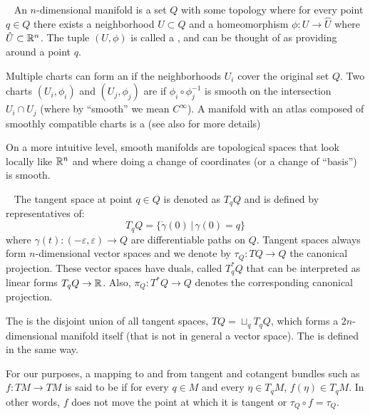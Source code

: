 \label{notion:manifold}~\cite[\S1]{leeSmoothManifolds2013} An $n$-dimensional manifold is a set $Q$ with some topology where for every point $q \in Q$ there exists a neighborhood $U \subset Q$ and a homeomorphism $\phi : U \to \hat{U}$ where $\hat{U} \subset {\mathbb{R}}^n$. The tuple $(U, \phi)$ is called a , and can be thought of as providing  around a point $q$.

Multiple charts can form an  if the neighborhoods $U_i$ cover the original set $Q$. Two charts $(U_i, \phi_i)$ and $(U_j, \phi_j)$ are  if $\phi_i \circ \phi_j^{-1}$ is smooth on the intersection $U_i \cap U_j$ (where by ``smooth'' we mean $C^\infty$). A manifold with an atlas composed of smoothly compatible charts is a  (see also \cite{marsdenIntroductionMechanicsSymmetry1999} for more details)%

On a more intuitive level, smooth manifolds are topological spaces that look locally like ${\mathbb{R}}^n$ and where doing a change of coordinates (or a change of ``basis'') is smooth.


~\cite[\S3]{leeSmoothManifolds2013} The tangent space at point $q \in Q$ is denoted as $T_q Q$ and is defined by representatives of:
\[ T_q Q = \{ \dot{\gamma}(0) \, | \, \gamma(0) = q \} \]
where $\gamma(t) : (-\varepsilon, \varepsilon) \to Q$ are differentiable paths on $Q$. Tangent spaces always form $n$-dimensional vector spaces and we denote by $\tau_Q: TQ \to Q$ the canonical projection. These vector spaces have duals, called  $T_q^* Q$ that can be interpreted as linear forms $T_q Q \to {\mathbb{R}}$. Also, $\pi_Q: T^*Q \to Q$ denotes the corresponding canonical projection. 

The  is the disjoint union of all tangent spaces, $TQ = \sqcup_q T_q Q$, which forms a $2n$-dimensional manifold itself (that is not in general a vector space). The  is defined in the same way.

For our purposes, a mapping to and from tangent and cotangent bundles such as $f : TM \to TM$ is said to be  if for every $q \in M$ and every $\eta \in T_q M$, $f(\eta) \in T_q M$. In other words, $f$ does not move the point at which it is tangent or $\tau_Q\circ f=\tau_Q$. %

